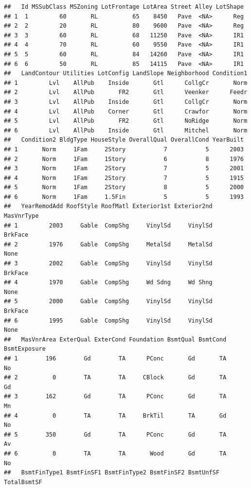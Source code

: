 \documentclass[]{article}
\begin{document}
\begin{verbatim}
##   Id MSSubClass MSZoning LotFrontage LotArea Street Alley LotShape
## 1  1         60       RL          65    8450   Pave  <NA>      Reg
## 2  2         20       RL          80    9600   Pave  <NA>      Reg
## 3  3         60       RL          68   11250   Pave  <NA>      IR1
## 4  4         70       RL          60    9550   Pave  <NA>      IR1
## 5  5         60       RL          84   14260   Pave  <NA>      IR1
## 6  6         50       RL          85   14115   Pave  <NA>      IR1
##   LandContour Utilities LotConfig LandSlope Neighborhood Condition1
## 1         Lvl    AllPub    Inside       Gtl      CollgCr       Norm
## 2         Lvl    AllPub       FR2       Gtl      Veenker      Feedr
## 3         Lvl    AllPub    Inside       Gtl      CollgCr       Norm
## 4         Lvl    AllPub    Corner       Gtl      Crawfor       Norm
## 5         Lvl    AllPub       FR2       Gtl      NoRidge       Norm
## 6         Lvl    AllPub    Inside       Gtl      Mitchel       Norm
##   Condition2 BldgType HouseStyle OverallQual OverallCond YearBuilt
## 1       Norm     1Fam     2Story           7           5      2003
## 2       Norm     1Fam     1Story           6           8      1976
## 3       Norm     1Fam     2Story           7           5      2001
## 4       Norm     1Fam     2Story           7           5      1915
## 5       Norm     1Fam     2Story           8           5      2000
## 6       Norm     1Fam     1.5Fin           5           5      1993
##   YearRemodAdd RoofStyle RoofMatl Exterior1st Exterior2nd MasVnrType
## 1         2003     Gable  CompShg     VinylSd     VinylSd    BrkFace
## 2         1976     Gable  CompShg     MetalSd     MetalSd       None
## 3         2002     Gable  CompShg     VinylSd     VinylSd    BrkFace
## 4         1970     Gable  CompShg     Wd Sdng     Wd Shng       None
## 5         2000     Gable  CompShg     VinylSd     VinylSd    BrkFace
## 6         1995     Gable  CompShg     VinylSd     VinylSd       None
##   MasVnrArea ExterQual ExterCond Foundation BsmtQual BsmtCond BsmtExposure
## 1        196        Gd        TA      PConc       Gd       TA           No
## 2          0        TA        TA     CBlock       Gd       TA           Gd
## 3        162        Gd        TA      PConc       Gd       TA           Mn
## 4          0        TA        TA     BrkTil       TA       Gd           No
## 5        350        Gd        TA      PConc       Gd       TA           Av
## 6          0        TA        TA       Wood       Gd       TA           No
##   BsmtFinType1 BsmtFinSF1 BsmtFinType2 BsmtFinSF2 BsmtUnfSF TotalBsmtSF

\end{verbatim}
\end{document}

